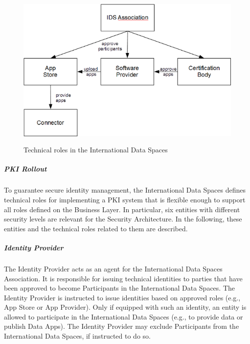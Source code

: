 
\begin{figure}[H]
	\begin{Center}
		\includegraphics[width=4.85in,height=3.09in]{./media/image61.png}
		\caption{ Technical roles in the International Data Spaces}
		\label{fig:_Technical_roles_in_the_International_Data_Spaces}
	\end{Center}
\end{figure}




\subparagraph*{PKI Rollout\\}
To guarantee secure identity management, the International Data Spaces defines technical roles for implementing a PKI system that is flexible enough to support all roles defined on the Business Layer. In particular, six entities with different security levels are relevant for the Security Architecture. In the following, these entities and the technical roles related to them are described. 

\subparagraph*{Identity Provider\\}

The Identity Provider acts as an agent for the International Data Spaces Association. It is responsible for issuing technical identities to parties that have been approved to become Participants in the International Data Spaces. The Identity Provider is instructed to issue identities based on approved roles (e.g., App Store or App Provider). Only if equipped with such an identity, an entity is allowed to participate in the International Data Spaces (e.g., to provide data or publish Data Apps). The Identity Provider may exclude Participants from the International Data Spaces, if instructed to do so. 

